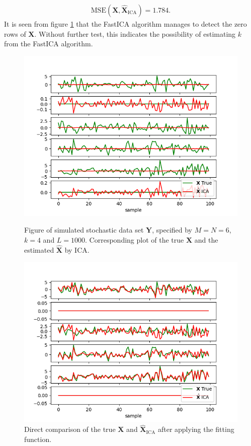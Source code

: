 \begin{align*}
\text{MSE}(\mathbf{X}, \hat{\mathbf{X}}_{\text{ICA}}) = 1.784.
\end{align*} 
It is seen from figure \ref{fig:appica6} that the FastICA algorithm manages to detect the zero rows of $\mathbf{X}$. Without further test, this indicates the possibility of estimating $k$ from the FastICA algorithm. 
\begin{figure}[H]
\begin{widepage}
    \begin{minipage}[t]{.45\textwidth}
		\centering
		\includegraphics[scale=0.5]{figures/ICAapp/ICA_app5.png}
	\caption{Figure of simulated stochastic data set $\mathbf{Y}$, specified by $M = N = 6$, $k = 4$ and $L = 1000$. Corresponding plot of the true $\mathbf{X}$ and the estimated $\hat{\mathbf{X}}$ by ICA.}
	\label{fig:appica5}
    \end{minipage} 
    \hfill
    \begin{minipage}[t]{.45\textwidth}
		\centering
		\includegraphics[scale=0.5]{figures/ICAapp/ICA_app6.png}
	\caption{Direct comparison of the true $\mathbf{X}$ and $\hat{\mathbf{X}}_{\text{ICA}}$ after applying the fitting function.}
	\label{fig:appica6}
    \end{minipage}
\end{widepage}
\end{figure}
